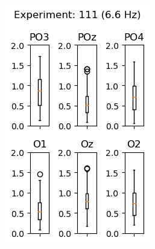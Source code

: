 \begin{figure}[ht]
    \begin{subfigure}{0.25\linewidth}
        \includegraphics[width=\linewidth]{images/appendix/11166.png}
        \label{fig:11166}
    \end{subfigure}
    \begin{subfigure}{0.25\linewidth}

\end{subfigure}
\end{figure}
